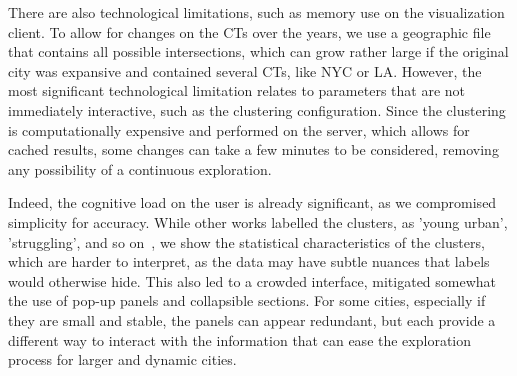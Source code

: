 There are also technological limitations, such as memory use on the
visualization client. To allow for changes on the CTs over the years, we use a
geographic file that contains all possible intersections, which can grow rather
large if the original city was expansive and contained several CTs, like NYC or
LA. However, the most significant technological limitation relates to parameters
that are not immediately interactive, such as the clustering configuration.
Since the clustering is computationally expensive and performed on the server,
which allows for cached results, some changes can take a few minutes to be
considered, removing any possibility of a continuous exploration. 


Indeed, the cognitive load on the user is already significant, as we compromised
simplicity for accuracy. While other works labelled the clusters, as 'young
urban', 'struggling', and so on~\cite{Delmelle2016,Delmelle2017}, we show the
statistical characteristics of the clusters, which are harder to interpret, as
the data may have subtle nuances that labels would otherwise hide. This also led
to a crowded interface, mitigated somewhat the use of pop-up panels and collapsible
sections. For some cities, especially if they are small and stable, the panels
can appear redundant, but each provide a different way to interact with the
information that can ease the exploration process for larger and dynamic cities.